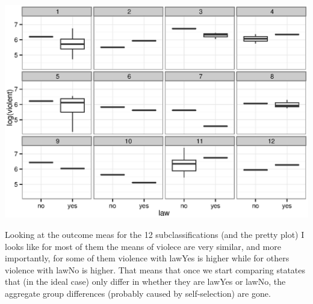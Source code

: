 \documentclass{article}\usepackage{graphicx, color}
\newenvironment{knitrout}{}{} %
\begin{document}
\begin{knitrout}
{\centering \includegraphics[width=\linewidth]{plots/unnamed-chunk-22} 

}


\end{knitrout}


Looking at the outcome meas for the 12 subclassifications (and the pretty plot) I looks like for most of them the means of violece are very similar, and more importantly, for some of them violence with lawYes is higher while for others violence with lawNo is higher. That means that once we start comparing statates that (in the ideal case) only differ in whether they are lawYes or lawNo, the aggregate group differences (probably caused by self-selection) are gone.
\end{document}
